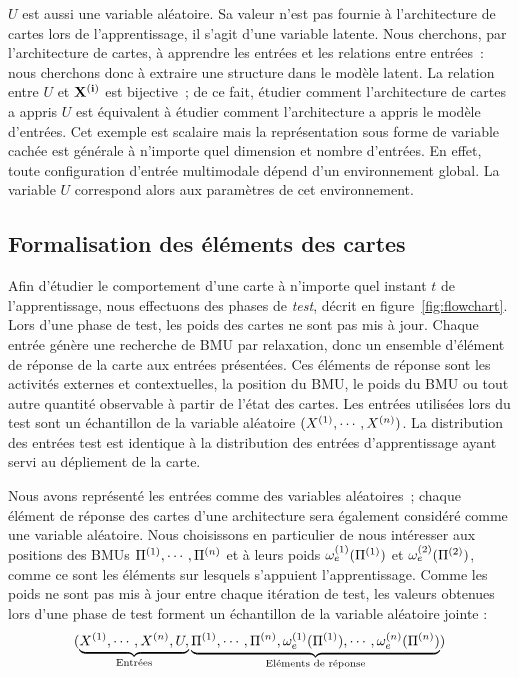 \documentclass[../main]{subfiles}
\begin{document}
$U$ est aussi une variable aléatoire. Sa valeur n'est pas fournie à l'architecture de cartes lors de l'apprentissage, il s'agit d'une variable latente.
Nous cherchons, par l'architecture de cartes, à apprendre les entrées et les relations entre entrées~: nous cherchons donc à extraire une structure dans le modèle latent. La relation entre $U$ et $\mathbf{X^{({i})}}$ est bijective~; de ce fait, étudier comment l'architecture de cartes a appris $U$ est équivalent à étudier comment l'architecture a appris le modèle d'entrées.
Cet exemple est scalaire mais la représentation sous forme de variable cachée est générale à n'importe quel dimension et nombre d'entrées. 
En effet, toute configuration d'entrée multimodale dépend d'un environnement global. La variable $U$ correspond alors aux paramètres de cet environnement.


\subsection{Formalisation des éléments des cartes}

Afin d'étudier le comportement d'une carte à n'importe quel instant $t$ de l'apprentissage, nous effectuons des phases de \emph{test}, décrit en figure~\ref{fig:flowchart}.
Lors d'une phase de test, les poids des cartes ne sont pas mis à jour. Chaque entrée génère une recherche de BMU par relaxation, donc un ensemble d'élément de réponse de la carte aux entrées présentées. Ces éléments de réponse sont les activités externes et contextuelles, la position du BMU, le poids du BMU ou tout autre quantité observable à partir de l'état des cartes.
Les entrées utilisées lors du test sont un échantillon de la variable aléatoire $(X^{({1})}, \cdots, X^{({n})})$.
La distribution des entrées test est identique à la distribution des entrées d'apprentissage ayant servi au dépliement de la carte.

Nous avons représenté les entrées comme des variables aléatoires~; chaque élément de réponse des cartes d'une architecture sera également considéré comme une variable aléatoire.
Nous choisissons en particulier de nous intéresser aux positions des BMUs $\Pi^{({1})}, \cdots, \Pi^{({n})}$ et à leurs poids $\omega_{e}^{({1})}(\Pi^{({1})})$ et $\omega_{e}^{({2})}(\Pi^{({2})})$, comme ce sont les éléments sur lesquels s'appuient l'apprentissage.
Comme les poids ne sont pas mis à jour entre chaque itération de test, les valeurs obtenues lors d'une phase de test forment un échantillon de la variable aléatoire jointe :
$$(\underbrace{X^{({1})}, \cdots, X^{({n})}, U,}_{\text{Entrées}} \underbrace{\Pi^{({1})}, \cdots, \Pi^{({n})}, \omega_e^{({1})}(\Pi^{({1})}), \cdots, \omega_e^{({n})}(\Pi^{({n})})}_{\text{Eléments de réponse}})$$
\end{document}
